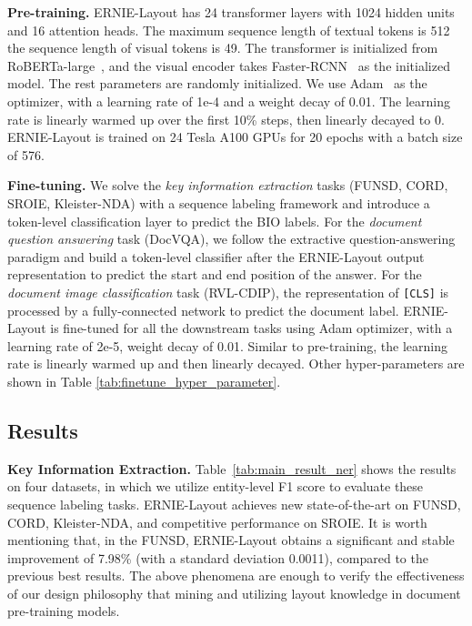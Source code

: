 \documentclass[11pt]{article}
\begin{document}
\noindent\textbf{Pre-training.}
ERNIE-Layout has 24 transformer layers with 1024 hidden units and 16 attention heads. 
The maximum sequence length of textual tokens is 512 the sequence length of visual tokens is 49.
The transformer is initialized from RoBERTa-large~\cite{liu2019roberta}, and the visual encoder takes Faster-RCNN~\cite{ren2015faster} as the initialized model. 
The rest parameters are randomly initialized.
We use Adam~\cite{kingma2014adam} as the optimizer, with a learning rate of 1e-4 and a weight decay of 0.01. The learning rate is linearly warmed up over the first 10\% steps, then linearly decayed to 0. 
ERNIE-Layout is trained on 24 Tesla A100 GPUs for 20 epochs with a batch size of 576. 

\noindent\textbf{Fine-tuning.}
We solve the \emph{key information extraction} tasks (FUNSD, CORD, SROIE, Kleister-NDA) with a sequence labeling framework and introduce a token-level classification layer to predict the BIO labels. 
For the \emph{document question answering} task (DocVQA), we follow the extractive question-answering paradigm and build a token-level classifier after the ERNIE-Layout output representation to predict the start and end position of the answer.
For the \emph{document image classification} task (RVL-CDIP), the representation of \verb|[CLS]| is processed by a fully-connected network to predict the document label. 
ERNIE-Layout is fine-tuned for all the downstream tasks using Adam optimizer, with a learning rate of 2e-5, weight decay of 0.01. 
Similar to pre-training, the learning rate is linearly warmed up and then linearly decayed.
Other hyper-parameters are shown in Table \ref{tab:finetune_hyper_parameter}. 


\subsection{Results}
\label{sec:exp_results}

\noindent\textbf{Key Information Extraction.}
Table~\ref{tab:main_result_ner} shows the results on four datasets, in which we utilize entity-level F1 score to evaluate these sequence labeling tasks.
ERNIE-Layout achieves new state-of-the-art on FUNSD, CORD, Kleister-NDA, and competitive performance on SROIE.
It is worth mentioning that, in the FUNSD, ERNIE-Layout obtains a significant and stable improvement of 7.98\% (with a standard deviation 0.0011), compared to the previous best results.
The above phenomena are enough to verify the effectiveness of our design philosophy that mining and utilizing layout knowledge in document pre-training models.
\end{document}
